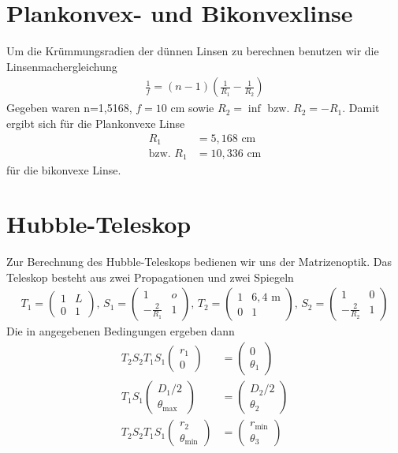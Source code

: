 \documentclass[twoside,colorback,accentcolor=tud4c,11pt]{tudreport}
\begin{document}
\section{Plankonvex- und Bikonvexlinse}
Um die Krümmungsradien der dünnen Linsen zu berechnen benutzen wir die Linsenmachergleichung
\begin{align}
\frac{1}{f}=(n-1)\left(\frac{1}{R_1}-\frac{1}{R_2}\right)
\end{align}
Gegeben waren n=1,5168, $ f=10 $ cm sowie $ R_2=\inf $ bzw. $ R_2=-R_1 $. Damit ergibt sich für die Plankonvexe Linse
\begin{align}
R_1&=5,168\text{ cm}\\
\text{bzw. }R_1&=10,336\text{ cm}
\end{align}
für die bikonvexe Linse.
\section{Hubble-Teleskop}
Zur Berechnung des Hubble-Teleskops bedienen wir uns der Matrizenoptik. Das Teleskop besteht aus zwei Propagationen und zwei Spiegeln
\begin{align}
T_1=\begin{pmatrix}
1&L\\
0&1
\end{pmatrix},\,
S_1=\begin{pmatrix}
1&o\\
-\frac{2}{R_1}&1
\end{pmatrix},\,
T_2=\begin{pmatrix}
1&6,4\text{ m}\\
0&1
\end{pmatrix},\,
S_2=\begin{pmatrix}
1&0\\
-\frac{2}{R_2}&1
\end{pmatrix}
\end{align} 
Die in \cite{anl} angegebenen Bedingungen ergeben dann
\begin{align}
T_2S_2T_1S_1\begin{pmatrix}
r_1\\
0
\end{pmatrix}
&=\begin{pmatrix}
0\\
\theta_1
\end{pmatrix}\\
T_1S_1\begin{pmatrix}
D_1/2\\
\theta_{\text{max}}
\end{pmatrix}
&=\begin{pmatrix}
D_2/2\\
\theta_2
\end{pmatrix}\\
T_2S_2T_1S_1\begin{pmatrix}
r_2\\
\theta_{\text{min}}
\end{pmatrix}
&=\begin{pmatrix}
r_{\text{min}}\\
\theta_3
\end{pmatrix}
\end{align}
\end{document}
